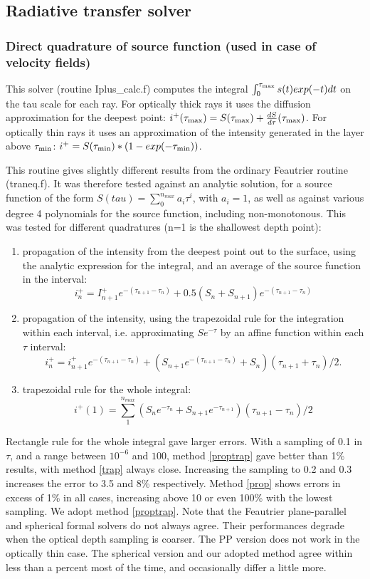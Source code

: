 \documentclass[a4paper,12pt]{article}
\begin{document}
\subsection{Radiative transfer solver}
\subsubsection{Direct quadrature of source function (used in case of velocity fields)}
This solver (routine Iplus\_calc.f) computes the integral ${\int_0^{\tau_{\rm max}}s(t) exp(-t) dt}$ on the tau scale for each 
ray. For optically thick rays it uses the diffusion approximation for the deepest point: 
$i^+(\tau_{\rm max}) = S(\tau_{\rm max})+\frac{dS}{d\tau}(\tau_{\rm max})$.
For optically thin rays it uses an approximation of the intensity generated in the layer above $\tau_{\rm min}$: 
$i^+ = S(\tau_{\rm min}) * (1-exp(-\tau_{\rm min}))$.

This routine gives slightly different results from the ordinary Feautrier routine (traneq.f). It was therefore tested against
an analytic solution, for a source function of the form $S(tau)=\sum_0^{n_{max}}{a_i \tau^i}$, with $a_i = 1$, as well as against various degree 4 polynomials for the source function, including non-monotonous.
This was tested  for different quadratures (n=1 is the shallowest depth point):
\begin{enumerate}
\item propagation of the intensity from the deepest point out to the surface, using the analytic expression for the integral, 
and an average of the source function in the interval: 
$$i^+_n=I^+_{n+1} e^{-(\tau_{n+1}-\tau_{n})} + 0.5 (S_{n}+S_{n+1}) e^{-(\tau_{n+1}-\tau_{n})}$$\label{prop}
\item propagation of the intensity, using the trapezoidal rule for the integration within each interval, i.e. approximating $Se^{-\tau}$ by an affine function within each $\tau$ interval: 
$$i^+_n=i^+_{n+1} e^{-(\tau_{n+1}-\tau_{n})}+ (S_{n+1} e^{-(\tau_{n+1}-\tau_{n})} + S_n) (\tau_{n+1}+\tau_n)/2.$$\label{proptrap}
\item trapezoidal rule for the whole integral: 
$$i^+(1)=\sum_1^{n_{max}}{(S_{n}e^{-\tau_n}+S_{n+1}e^{-\tau_{n+1}})(\tau_{n+1}-\tau_{n})/2}$$\label{trap}
\end{enumerate}
Rectangle rule for the whole integral gave larger errors.
With a sampling of 0.1 in $\tau$, and a range between $10^{-6}$ and $100$, method \ref{proptrap} gave better than 1\% results, with method \ref{trap} always close. Increasing the sampling to 0.2 and 0.3 increases the error to 
3.5 and 8\% respectively.
Method \ref{prop} shows errors in excess of 1\% in all cases, increasing above 10 or even 100\% with the lowest sampling.
We adopt method \ref{proptrap}.
Note that the Feautrier plane-parallel and spherical formal solvers do not always agree. Their performances degrade
when the optical depth sampling is coarser. The PP version does not work in the optically thin case.
The spherical version and our adopted method agree within less than a percent most of the time, and occasionally differ a 
little more.
\end{document}
